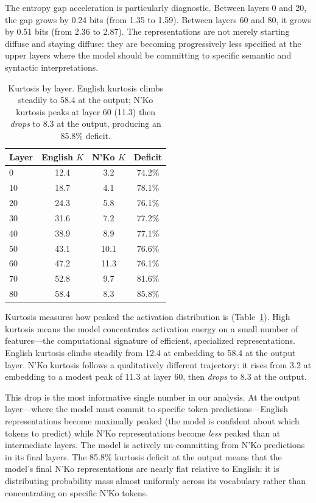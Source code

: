 \documentclass[11pt]{article}
\begin{document}
The entropy gap acceleration is particularly diagnostic.
Between layers 0 and 20, the gap grows by 0.24 bits (from 1.35 to 1.59).
Between layers 60 and 80, it grows by 0.51 bits (from 2.36 to 2.87).
The representations are not merely starting diffuse and staying diffuse: they are becoming progressively less specified at the upper layers where the model should be committing to specific semantic and syntactic interpretations.

\begin{table}[t]
\centering
\small
\begin{tabular}{lccc}
\toprule
\textbf{Layer} & \textbf{English $K$} & \textbf{N'Ko $K$} & \textbf{Deficit} \\
\midrule
0 & 12.4 & 3.2 & 74.2\% \\
10 & 18.7 & 4.1 & 78.1\% \\
20 & 24.3 & 5.8 & 76.1\% \\
30 & 31.6 & 7.2 & 77.2\% \\
40 & 38.9 & 8.9 & 77.1\% \\
50 & 43.1 & 10.1 & 76.6\% \\
60 & 47.2 & 11.3 & 76.1\% \\
70 & 52.8 & 9.7 & 81.6\% \\
80 & 58.4 & 8.3 & 85.8\% \\
\bottomrule
\end{tabular}
\caption{Kurtosis by layer. English kurtosis climbs steadily to 58.4 at the output; N'Ko kurtosis peaks at layer 60 (11.3) then \emph{drops} to 8.3 at the output, producing an 85.8\% deficit.}
\label{tab:kurtosis}
\end{table}

Kurtosis measures how peaked the activation distribution is (Table~\ref{tab:kurtosis}).
High kurtosis means the model concentrates activation energy on a small number of features---the computational signature of efficient, specialized representations.
English kurtosis climbs steadily from 12.4 at embedding to 58.4 at the output layer.
N'Ko kurtosis follows a qualitatively different trajectory: it rises from 3.2 at embedding to a modest peak of 11.3 at layer 60, then \emph{drops} to 8.3 at the output.

This drop is the most informative single number in our analysis.
At the output layer---where the model must commit to specific token predictions---English representations become maximally peaked (the model is confident about which tokens to predict) while N'Ko representations become \emph{less} peaked than at intermediate layers.
The model is actively un-committing from N'Ko predictions in its final layers.
The 85.8\% kurtosis deficit at the output means that the model's final N'Ko representations are nearly flat relative to English: it is distributing probability mass almost uniformly across its vocabulary rather than concentrating on specific N'Ko tokens.
\end{document}
